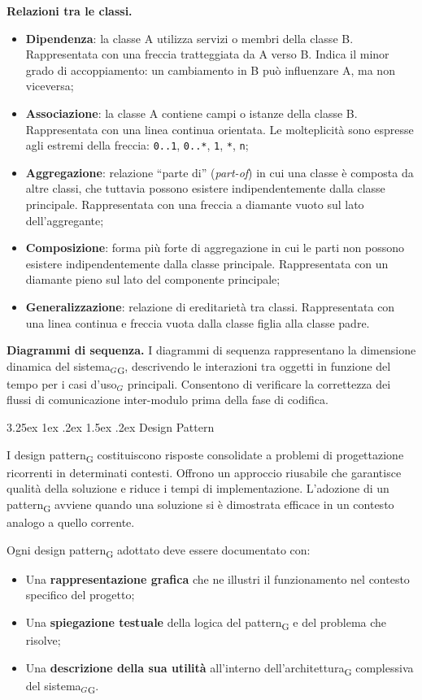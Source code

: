 \documentclass[a4paper, 10pt]{article}
\makeatletter
\renewcommand\paragraph{\@startsection{paragraph}{4}{\z@}%
  {3.25ex \@plus1ex \@minus .2ex}%
  {1.5ex \@plus .2ex}%
  {\normalfont\normalsize\bfseries}}
\makeatother
\begin{document}
\textbf{Relazioni tra le classi.}
\begin{itemize}
    \item \textbf{Dipendenza}: la classe A utilizza servizi o membri della classe B. Rappresentata con una freccia tratteggiata da A verso B. Indica il minor grado di accoppiamento: un cambiamento in B può influenzare A, ma non viceversa;
    \item \textbf{Associazione}: la classe A contiene campi o istanze della classe B. Rappresentata con una linea continua orientata. Le molteplicità sono espresse agli estremi della freccia: \texttt{0..1}, \texttt{0..*}, \texttt{1}, \texttt{*}, \texttt{n};
    \item \textbf{Aggregazione}: relazione ``parte di'' (\textit{part-of}) in cui una classe è composta da altre classi, che tuttavia possono esistere indipendentemente dalla classe principale. Rappresentata con una freccia a diamante vuoto sul lato dell'aggregante;
    \item \textbf{Composizione}: forma più forte di aggregazione in cui le parti non possono esistere indipendentemente dalla classe principale. Rappresentata con un diamante pieno sul lato del componente principale;
    \item \textbf{Generalizzazione}: relazione di ereditarietà tra classi. Rappresentata con una linea continua e freccia vuota dalla classe figlia alla classe padre.
\end{itemize}

\textbf{Diagrammi di sequenza.} I diagrammi di sequenza rappresentano la dimensione dinamica del sistema$_G$\textsubscript{G}, descrivendo le interazioni tra oggetti in funzione del tempo per i casi d'uso$_G$ principali. Consentono di verificare la correttezza dei flussi di comunicazione inter-modulo prima della fase di codifica.

\paragraph{Design Pattern}

I design pattern\textsubscript{G} costituiscono risposte consolidate a problemi di progettazione ricorrenti in determinati contesti. Offrono un approccio riusabile che garantisce qualità della soluzione e riduce i tempi di implementazione. L'adozione di un pattern\textsubscript{G} avviene quando una soluzione si è dimostrata efficace in un contesto analogo a quello corrente.

Ogni design pattern\textsubscript{G} adottato deve essere documentato con:
\begin{itemize}
    \item Una \textbf{rappresentazione grafica} che ne illustri il funzionamento nel contesto specifico del progetto;
    \item Una \textbf{spiegazione testuale} della logica del pattern\textsubscript{G} e del problema che risolve;
    \item Una \textbf{descrizione della sua utilità} all'interno dell'architettura\textsubscript{G} complessiva del sistema$_G$\textsubscript{G}.
\end{itemize}
\end{document}
